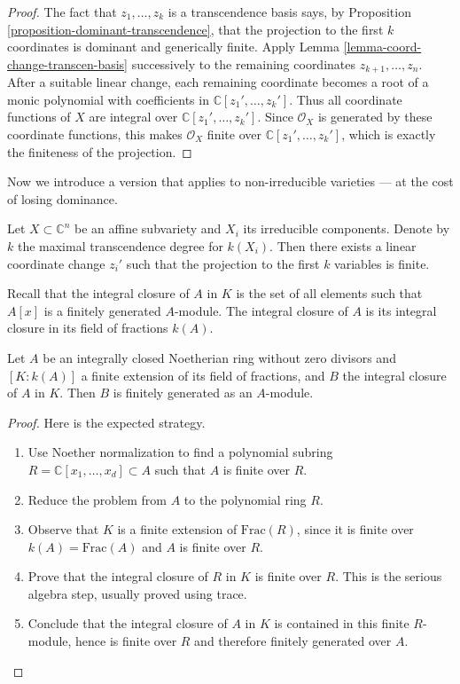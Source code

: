 \begin{proof}
The fact that $z_1,\ldots,z_k$ is a
transcendence basis says, by Proposition
\ref{proposition-dominant-transcendence},
that the projection to the first $k$
coordinates is dominant and generically
finite.
Apply Lemma
\ref{lemma-coord-change-transcen-basis}
successively to the remaining coordinates
$z_{k+1},\ldots,z_n$.
After a suitable linear change, each
remaining
coordinate becomes a root of a monic
polynomial with coefficients in
$\mathbb{C}[z_1',\ldots,z_k']$.
Thus all coordinate functions of $X$ are
integral over
$\mathbb{C}[z_1',\ldots,z_k']$.
Since $\mathcal{O}_X$ is generated by these
coordinate functions, this makes
$\mathcal{O}_X$ finite over
$\mathbb{C}[z_1',\ldots,z_k']$, which is
exactly the finiteness of the projection.
\end{proof}

\noindent
Now we introduce a version that
applies to non-irreducible varieties
--- at the cost of losing dominance.

\begin{proposition}
\label{proposition-noether-reducible-vars}
Let $X \subset \mathbb{C}^n$ be an affine
subvariety and $X_i$ its irreducible
components. Denote by $k$ the maximal
transcendence degree for $k(X_i)$.
Then there exists a linear coordinate
change $z_i'$ such that the projection
to the first $k$ variables is finite.
\end{proposition}

\noindent
Recall that the integral closure of $A$ 
in $K$ is the set of all elements
such that $A[x]$ is a finitely
generated $A$-module.
The integral closure of $A$ is its integral
closure in its field of fractions $k(A)$.

\begin{theorem}
\label{theorem-integrl-clsure-fntly-genertd}
Let $A$ be an integrally closed Noetherian
ring without zero divisors and
$[K:k(A)]$ a finite extension of its
field of fractions, and $B$ the
integral closure of $A$ in $K$.
Then $B$ is finitely generated
as an $A$-module.
\end{theorem}

\begin{proof}
Here is the expected strategy.
\begin{enumerate}
\item Use Noether normalization to find a
polynomial subring
$R=\mathbb{C}[x_1,\ldots,x_d]\subset A$
such that $A$ is finite over $R$.
\item Reduce the problem from $A$ to the
polynomial ring $R$.
\item Observe that $K$ is a finite extension
of $\text{Frac}(R)$, since it is finite over
$k(A)=\text{Frac}(A)$ and $A$ is finite over
$R$.
\item Prove that the integral closure of
$R$ in $K$ is finite over $R$.
This is the serious algebra step, usually
proved using trace.
\item Conclude that the integral closure of
$A$ in $K$ is contained in this finite
$R$-module, hence is finite over $R$ and
therefore finitely generated over $A$.
\end{enumerate}
\end{proof}

